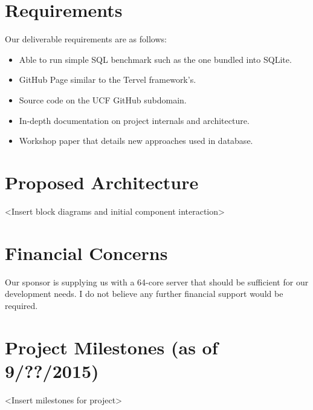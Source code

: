 \documentclass[letterpaper]{article}
\begin{document}
  \section{Requirements}
  Our deliverable requirements are as follows:
  \begin{itemize}
   \item Able to run simple SQL benchmark such as the one bundled into SQLite.
   \item GitHub Page similar to the Tervel framework's.
   \item Source code on the UCF GitHub subdomain.
   \item In-depth documentation on project internals and architecture.
   \item Workshop paper that details new approaches used in database.
  \end{itemize}
  
  \section{Proposed Architecture}
  \textless Insert block diagrams and initial component interaction\textgreater
  
  \section{Financial Concerns}
  Our sponsor is supplying us with a 64-core server that should be sufficient for our development needs. I do not believe any further financial
  support would be required.
  
  \section{Project Milestones (as of 9/??/2015)}
  \textless Insert milestones for project\textgreater
\end{document}
